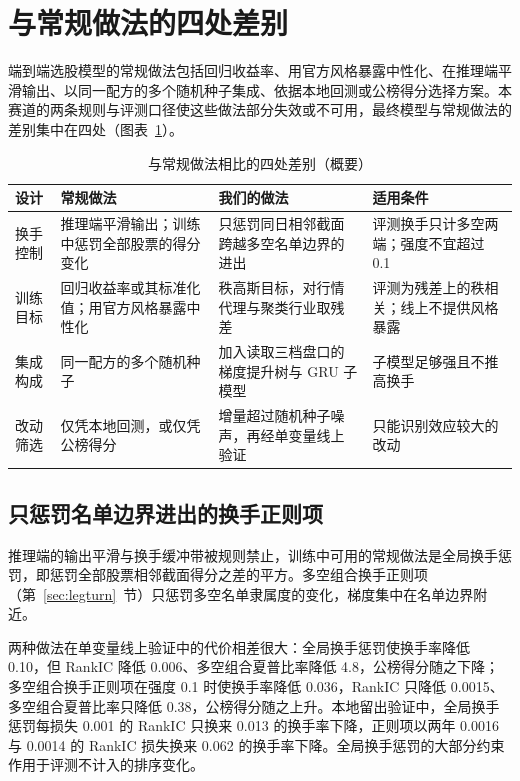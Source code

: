 \documentclass[UTF8,a4paper,zihao=-4,fontset=none]{ctexart}
\newcommand{\tabsetup}{\small\linespread{1.15}\selectfont\renewcommand{\arraystretch}{1.25}}
\newcommand{\figref}[1]{图表~\ref{#1}}
\begin{document}
\section{与常规做法的四处差别}\label{sec:innov}

端到端选股模型的常规做法包括回归收益率、用官方风格暴露中性化、在推理端平滑输出、以同一配方的多个随机种子集成、依据本地回测或公榜得分选择方案。本赛道的两条规则与评测口径使这些做法部分失效或不可用，最终模型与常规做法的差别集中在四处（\figref{tab:innov}）。

\begin{table}[htbp]
\caption{与常规做法相比的四处差别（概要）}\label{tab:innov}
\centering\tabsetup
\begin{tabularx}{\textwidth}{@{}p{4.2em}>{\raggedright\arraybackslash}X>{\raggedright\arraybackslash}X>{\raggedright\arraybackslash}X@{}}
\toprule
设计 & 常规做法 & 我们的做法 & 适用条件\\
\midrule
换手控制 & 推理端平滑输出；训练中惩罚全部股票的得分变化 & 只惩罚同日相邻截面跨越多空名单边界的进出 & 评测换手只计多空两端；强度不宜超过 0.1\\
训练目标 & 回归收益率或其标准化值；用官方风格暴露中性化 & 秩高斯目标，对行情代理与聚类行业取残差 & 评测为残差上的秩相关；线上不提供风格暴露\\
集成构成 & 同一配方的多个随机种子 & 加入读取三档盘口的梯度提升树与 GRU 子模型 & 子模型足够强且不推高换手\\
改动筛选 & 仅凭本地回测，或仅凭公榜得分 & 增量超过随机种子噪声，再经单变量线上验证 & 只能识别效应较大的改动\\
\bottomrule
\end{tabularx}
\end{table}

\subsection{只惩罚名单边界进出的换手正则项}

推理端的输出平滑与换手缓冲带被规则禁止，训练中可用的常规做法是全局换手惩罚，即惩罚全部股票相邻截面得分之差的平方。多空组合换手正则项（第~\ref{sec:legturn}~节）只惩罚多空名单隶属度的变化，梯度集中在名单边界附近。

两种做法在单变量线上验证中的代价相差很大：全局换手惩罚使换手率降低 0.10，但 RankIC 降低 0.006、多空组合夏普比率降低 4.8，公榜得分随之下降；多空组合换手正则项在强度 0.1 时使换手率降低 0.036，RankIC 只降低 0.0015、多空组合夏普比率只降低 0.38，公榜得分随之上升。本地留出验证中，全局换手惩罚每损失 0.001 的 RankIC 只换来 0.013 的换手率下降，正则项以两年 0.0016 与 0.0014 的 RankIC 损失换来 0.062 的换手率下降。全局换手惩罚的大部分约束作用于评测不计入的排序变化。
\end{document}
